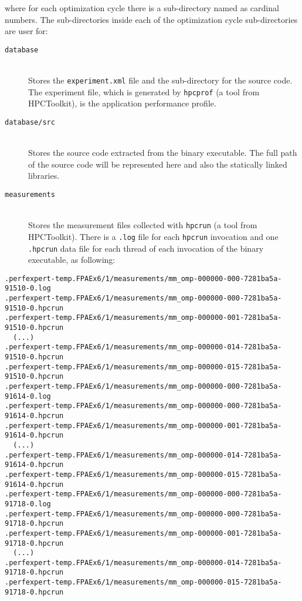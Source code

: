 \noindent where for each optimization cycle there is a sub-directory named as cardinal numbers. The sub-directories inside each of the optimization cycle sub-directories are user for:

\begin{description}
	\item[\texttt{database}]\hfill \\
	Stores the \texttt{experiment.xml} file and the sub-directory for the source code. The experiment file, which is generated by \texttt{hpcprof} (a tool from HPCToolkit), is the application performance profile.

	\item[\texttt{database/src}]\hfill \\
	Stores the source code extracted from the binary executable. The full path of the source code will be represented here and also the statically linked libraries.

	\item[\texttt{measurements}]\hfill \\
	Stores the measurement files collected with \texttt{hpcrun} (a tool from HPCToolkit). There is a \texttt{.log} file for each \texttt{hpcrun} invocation and one \texttt{.hpcrun} data file for each thread of each invocation of the binary executable, as following:
\end{description}

\begin{verbatim}
.perfexpert-temp.FPAEx6/1/measurements/mm_omp-000000-000-7281ba5a-91510-0.log
.perfexpert-temp.FPAEx6/1/measurements/mm_omp-000000-000-7281ba5a-91510-0.hpcrun
.perfexpert-temp.FPAEx6/1/measurements/mm_omp-000000-001-7281ba5a-91510-0.hpcrun
  (...)
.perfexpert-temp.FPAEx6/1/measurements/mm_omp-000000-014-7281ba5a-91510-0.hpcrun
.perfexpert-temp.FPAEx6/1/measurements/mm_omp-000000-015-7281ba5a-91510-0.hpcrun
.perfexpert-temp.FPAEx6/1/measurements/mm_omp-000000-000-7281ba5a-91614-0.log
.perfexpert-temp.FPAEx6/1/measurements/mm_omp-000000-000-7281ba5a-91614-0.hpcrun
.perfexpert-temp.FPAEx6/1/measurements/mm_omp-000000-001-7281ba5a-91614-0.hpcrun
  (...)
.perfexpert-temp.FPAEx6/1/measurements/mm_omp-000000-014-7281ba5a-91614-0.hpcrun
.perfexpert-temp.FPAEx6/1/measurements/mm_omp-000000-015-7281ba5a-91614-0.hpcrun
.perfexpert-temp.FPAEx6/1/measurements/mm_omp-000000-000-7281ba5a-91718-0.log
.perfexpert-temp.FPAEx6/1/measurements/mm_omp-000000-000-7281ba5a-91718-0.hpcrun
.perfexpert-temp.FPAEx6/1/measurements/mm_omp-000000-001-7281ba5a-91718-0.hpcrun
  (...)
.perfexpert-temp.FPAEx6/1/measurements/mm_omp-000000-014-7281ba5a-91718-0.hpcrun
.perfexpert-temp.FPAEx6/1/measurements/mm_omp-000000-015-7281ba5a-91718-0.hpcrun
\end{verbatim}

